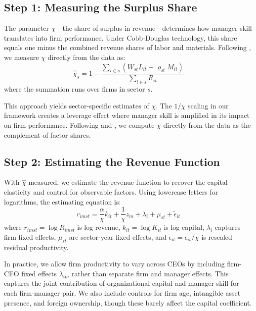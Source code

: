 \documentclass[11pt,a4paper]{article}
\begin{document}
\subsection{Step 1: Measuring the Surplus Share}

The parameter $\chi$—the share of surplus in revenue—determines how manager skill translates into firm performance. Under Cobb-Douglas technology, this share equals one minus the combined revenue shares of labor and materials. Following \citet{Gandhi2020-nu}, we measure $\chi$ directly from the data as:
\begin{equation}
\hat{\chi}_s = 1 - \frac{\sum_{i \in s}(W_{st}L_{it} + \varrho_{st}M_{it})}{\sum_{i \in s} R_{it}}
\end{equation}
where the summation runs over firms in sector $s$.

This approach yields sector-specific estimates of $\chi$. The $1/\chi$ scaling in our framework creates a leverage effect where manager skill is amplified in its impact on firm performance. Following \citet{Halpern2015-se} and \citet{Gandhi2020-nu}, we compute $\chi$ directly from the data as the complement of factor shares.

\subsection{Step 2: Estimating the Revenue Function}

With $\hat{\chi}$ measured, we estimate the revenue function to recover the capital elasticity and control for observable factors. Using lowercase letters for logarithms, the estimating equation is:
\begin{equation}
r_{imst} = \frac{\alpha}{\chi} k_{it} + \frac{1}{\chi}z_m + \lambda_i + \mu_{st} + \tilde{\epsilon}_{it}
\end{equation}
where $r_{imst} = \log R_{imst}$ is log revenue, $k_{it} = \log K_{it}$ is log capital, $\lambda_i$ captures firm fixed effects, $\mu_{st}$ are sector-year fixed effects, and $\tilde{\epsilon}_{it} = \epsilon_{it}/\chi$ is rescaled residual productivity.

In practice, we allow firm productivity to vary across CEOs by including firm-CEO fixed effects $\lambda_{im}$ rather than separate firm and manager effects. This captures the joint contribution of organizational capital and manager skill for each firm-manager pair. We also include controls for firm age, intangible asset presence, and foreign ownership, though these barely affect the capital coefficient.
\end{document}

